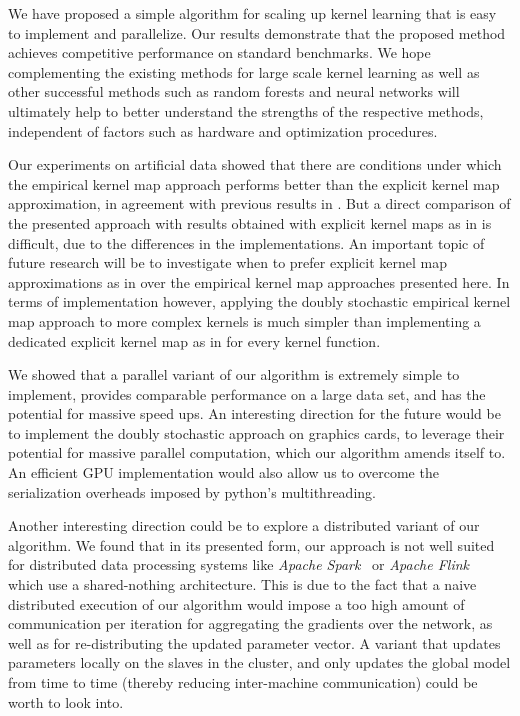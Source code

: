 \documentclass{article} %
\begin{document}
We have proposed a simple algorithm for scaling up kernel learning that is easy to implement and parallelize. Our results demonstrate that the proposed method achieves competitive performance on standard benchmarks. We hope complementing the existing methods for large scale kernel learning as well as other successful methods such as random forests and neural networks will ultimately help to better understand the strengths of the respective methods, independent of factors such as hardware and optimization procedures. 

Our experiments on artificial data showed that there are conditions under which the empirical kernel map approach performs better than the explicit kernel map approximation, in agreement with previous results in \cite{Vedaldi2010}. But a direct comparison of the presented approach with results obtained with explicit kernel maps as in \cite{Dai2014} is difficult, due to the differences in the implementations. An important topic of future research will be to investigate when to prefer explicit kernel map approximations as in \cite{Rahimi2008, Dai2014} over the empirical kernel map approaches presented here. In terms of implementation however, applying the doubly stochastic empirical kernel map approach to more complex kernels is much simpler than implementing a dedicated explicit kernel map as in \cite{Dai2014} for every kernel function. 

We showed that a parallel variant of our algorithm is extremely simple to implement, provides comparable performance on a large data set, and has the potential for massive speed ups. An interesting direction for the future would be to implement the doubly stochastic approach on graphics cards, to leverage their potential for massive parallel computation, which our algorithm amends itself to. An efficient GPU implementation would also allow us to overcome the serialization overheads imposed by python's multithreading.

Another interesting direction could be to explore a distributed variant of our algorithm. We found that in its presented form, our approach is not well suited for distributed data processing systems like \textit{Apache Spark}~\cite{Zaharia2012} or \textit{Apache Flink}~\cite{Alexandrov2014} which use a shared-nothing architecture. This is due to the fact that a naive distributed execution of our algorithm would impose a too high amount of communication per iteration for aggregating the gradients over the network, as well as for re-distributing the updated parameter vector. A variant that updates parameters locally on the slaves in the cluster, and only updates the global model from time to time (thereby reducing inter-machine communication) could be worth to look into. 

\newpage

{\small
  
  }
\end{document}
